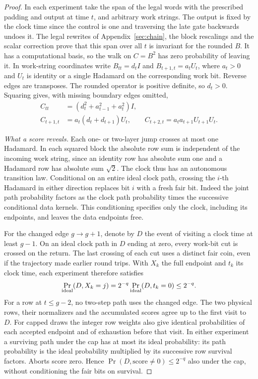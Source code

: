 \documentclass[11pt]{article}
\begin{document}
\begin{proof}
In each experiment take the span of the legal words with the prescribed padding and output at time \(t\), and arbitrary work strings. The output is fixed by the clock time since the control is one and traversing the late gate backwards undoes it. The legal rewrites of Appendix~\ref{sec:chain}, the block rescalings and the scalar correction prove that this span over all \(t\) is invariant for the rounded \(B\). It has a computational basis, so the walk on \(C=B^2\) has zero probability of leaving it. In work-string coordinates write \(B_{tt}=d_t I\) and \(B_{t+1,t}=a_t U_t\), where \(a_t>0\) and \(U_t\) is identity or a single Hadamard on the corresponding work bit. Reverse edges are transposes. The rounded operator is positive definite, so \(d_t>0\). Squaring gives, with missing boundary edges omitted,
\[
 \begin{split}
 C_{tt}&=(d_t^2+a_{t-1}^2+a_t^2)I,\\
 C_{t+1,t}&=a_t(d_t+d_{t+1})U_t,\qquad
 C_{t+2,t}=a_ta_{t+1}U_{t+1}U_t .
 \end{split}
\]

\emph{What a score reveals.}
Each one- or two-layer jump crosses at most one Hadamard. In each squared block the absolute row sum is independent of the incoming work string, since an identity row has absolute sum one and a Hadamard row has absolute sum \(\sqrt2\). The clock thus has an autonomous transition law. Conditional on an entire ideal clock path, crossing the \(i\)-th Hadamard in either direction replaces bit \(i\) with a fresh fair bit. Indeed the joint path probability factors as the clock path probability times the successive conditional data kernels. This conditioning specifies only the clock, including its endpoints, and leaves the data endpoints free.

For the changed edge \(g\to g+1\), denote by \(D\) the event of visiting a clock time at least \(g-1\). On an ideal clock path in \(D\) ending at zero, every work-bit cut is crossed on the return. The last crossing of each cut uses a distinct fair coin, even if the trajectory made earlier round trips. With \(X_k\) the full endpoint and \(t_k\) its clock time, each experiment therefore satisfies
\[
 \Pr_{\rm ideal}(D,X_k=j)=2^{-q}\Pr_{\rm ideal}(D,t_k=0)\le 2^{-q}.
\]
For a row at \(t\le g-2\), no two-step path uses the changed edge. The two physical rows, their normalizers and the accumulated scores agree up to the first visit to \(D\). For capped draws the integer row weights also give identical probabilities of each accepted endpoint and of exhaustion before that visit. In either experiment a surviving path under the cap has at most its ideal probability: its path probability is the ideal probability multiplied by its successive row survival factors. Aborts score zero. Hence \(\Pr(D,\text{score}\ne0)\le 2^{-q}\) also under the cap, without conditioning the fair bits on survival.


\end{proof}
\end{document}
